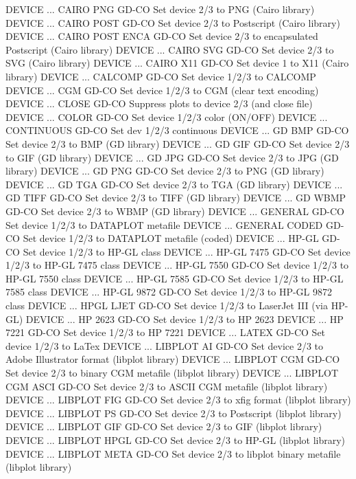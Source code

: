 DEVICE ... CAIRO PNG        GD-CO Set device 2/3 to PNG (Cairo library)
DEVICE ... CAIRO POST       GD-CO Set device 2/3 to Postscript (Cairo library)
DEVICE ... CAIRO POST ENCA  GD-CO Set device 2/3 to encapsulated Postscript (Cairo library)
DEVICE ... CAIRO SVG        GD-CO Set device 2/3 to SVG (Cairo library)
DEVICE ... CAIRO X11        GD-CO Set device 1 to X11 (Cairo library)
DEVICE ... CALCOMP          GD-CO Set device 1/2/3 to CALCOMP
DEVICE ... CGM              GD-CO Set device 1/2/3 to CGM (clear text encoding)
DEVICE ... CLOSE            GD-CO Suppress plots to device 2/3 (and close file)
DEVICE ... COLOR            GD-CO Set device 1/2/3 color (ON/OFF)
DEVICE ... CONTINUOUS       GD-CO Set dev 1/2/3 continuous
DEVICE ... GD BMP           GD-CO Set device 2/3 to BMP (GD library)
DEVICE ... GD GIF           GD-CO Set device 2/3 to GIF (GD library)
DEVICE ... GD JPG           GD-CO Set device 2/3 to JPG (GD library)
DEVICE ... GD PNG           GD-CO Set device 2/3 to PNG (GD library)
DEVICE ... GD TGA           GD-CO Set device 2/3 to TGA (GD library)
DEVICE ... GD TIFF          GD-CO Set device 2/3 to TIFF (GD library)
DEVICE ... GD WBMP          GD-CO Set device 2/3 to WBMP (GD library)
DEVICE ... GENERAL          GD-CO Set device 1/2/3 to DATAPLOT metafile
DEVICE ... GENERAL CODED    GD-CO Set device 1/2/3 to DATAPLOT metafile (coded)
DEVICE ... HP-GL            GD-CO Set device 1/2/3 to HP-GL class
DEVICE ... HP-GL 7475       GD-CO Set device 1/2/3 to HP-GL 7475 class
DEVICE ... HP-GL 7550       GD-CO Set device 1/2/3 to HP-GL 7550 class
DEVICE ... HP-GL 7585       GD-CO Set device 1/2/3 to HP-GL 7585 class
DEVICE ... HP-GL 9872       GD-CO Set device 1/2/3 to HP-GL 9872 class
DEVICE ... HPGL LJET        GD-CO Set device 1/2/3 to LaserJet III (via HP-GL)
DEVICE ... HP 2623          GD-CO Set device 1/2/3 to HP 2623
DEVICE ... HP 7221          GD-CO Set device 1/2/3 to HP 7221
DEVICE ... LATEX            GD-CO Set device 1/2/3 to LaTex
DEVICE ... LIBPLOT AI       GD-CO Set device 2/3 to Adobe Illustrator format (libplot library)
DEVICE ... LIBPLOT CGM      GD-CO Set device 2/3 to binary CGM metafile (libplot library)
DEVICE ... LIBPLOT CGM ASCI GD-CO Set device 2/3 to ASCII CGM metafile (libplot library)
DEVICE ... LIBPLOT FIG      GD-CO Set device 2/3 to xfig format (libplot library)
DEVICE ... LIBPLOT PS       GD-CO Set device 2/3 to Postscript (libplot library)
DEVICE ... LIBPLOT GIF      GD-CO Set device 2/3 to GIF (libplot library)
DEVICE ... LIBPLOT HPGL     GD-CO Set device 2/3 to HP-GL (libplot library)
DEVICE ... LIBPLOT META     GD-CO Set device 2/3 to libplot binary metafile (libplot library)

